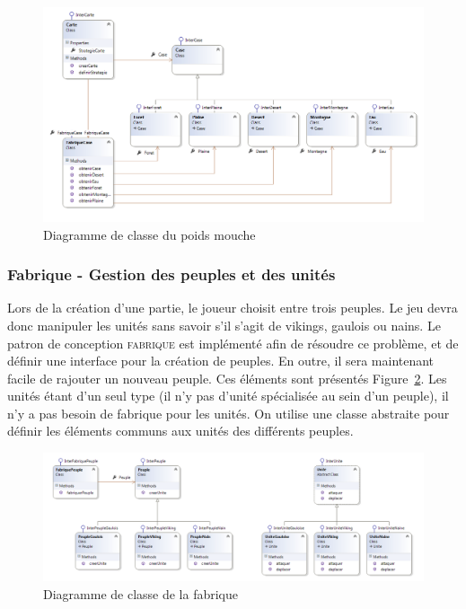 \documentclass[a4paper]{article}%
\begin{document}
\begin{figure}[H]
    \centering
    \includegraphics[width=\textwidth]{./images/classe/poidsmouche.png}
		\caption{Diagramme de classe du poids mouche}
		\label{fig:class_poidsmouche}
\end{figure}

\subsubsection{Fabrique - Gestion des peuples et des unités}

Lors de la création d'une partie, le joueur choisit entre trois peuples. Le jeu devra donc manipuler les unités sans savoir s'il s'agit de vikings, gaulois ou nains. Le patron de conception \textsc{fabrique} est implémenté afin de résoudre ce problème, et de définir une interface pour la création de peuples. En outre, il sera maintenant facile de rajouter un nouveau peuple. Ces éléments sont présentés Figure~\ref{fig:class_fabrique}.
Les unités étant d'un seul type (il n'y pas d'unité spécialisée au sein d'un peuple), il n'y a pas besoin de fabrique pour les unités. On utilise une classe abstraite pour définir les éléments communs aux unités des différents peuples. 

\begin{figure}[H]
    \centering
    \includegraphics[width=\textwidth]{./images/classe/fabrique.png}
		\caption{Diagramme de classe de la fabrique}
		\label{fig:class_fabrique}
\end{figure}
\end{document}
